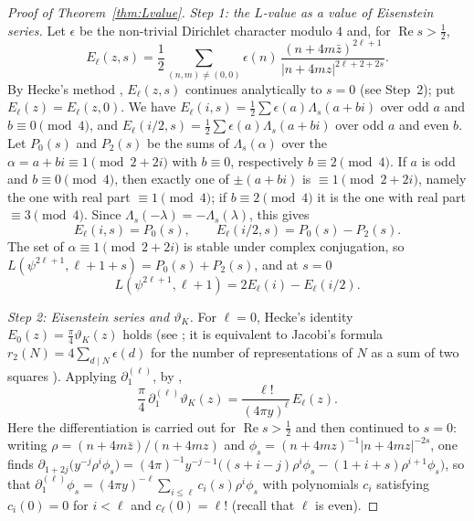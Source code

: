 \documentclass[11pt]{amsart}
\theoremstyle{definition}
\theoremstyle{remark}
\begin{document}
\begin{proof}[Proof of Theorem~\ref{thm:Lvalue}]
\emph{Step 1: the $L$-value as a value of Eisenstein series.} Let $\epsilon$ be the non-trivial
Dirichlet character modulo $4$ and, for $\operatorname{Re}s>\frac12$,
\[
E_\ell(z,s)=\frac12\sum_{(n,m)\ne(0,0)}\epsilon(n)\,\frac{(n+4m\bar z)^{2\ell+1}}{|n+4mz|^{2\ell+2+2s}} .
\]
By Hecke's method \cite{Hecke27}, $E_\ell(z,s)$ continues analytically to $s=0$ (see Step~2); put $E_\ell(z)=E_\ell(z,0)$. We have
$E_\ell(i,s)=\frac12\sum\epsilon(a)\Lambda_s(a+bi)$ over odd $a$ and $b\equiv0\pmod4$, and
$E_\ell(i/2,s)=\frac12\sum\epsilon(a)\Lambda_s(a+bi)$ over odd $a$ and even $b$. Let $P_0(s)$ and
$P_2(s)$ be the sums of $\Lambda_s(\alpha)$ over the $\alpha=a+bi\equiv1\pmod{2+2i}$ with
$b\equiv0$, respectively $b\equiv2\pmod4$. If $a$ is odd and $b\equiv0\pmod4$, then exactly one of
$\pm(a+bi)$ is $\equiv1\pmod{2+2i}$, namely the one with real part $\equiv1\pmod4$; if
$b\equiv2\pmod4$ it is the one with real part $\equiv3\pmod4$. Since
$\Lambda_s(-\lambda)=-\Lambda_s(\lambda)$, this gives
\[
E_\ell(i,s)=P_0(s),\qquad E_\ell(i/2,s)=P_0(s)-P_2(s).
\]
The set of $\alpha\equiv1\pmod{2+2i}$ is stable under complex conjugation, so
$L(\psi^{2\ell+1},\ell+1+s)=P_0(s)+P_2(s)$, and at $s=0$
\begin{equation}\label{eq:L-eis}
L(\psi^{2\ell+1},\ell+1)=2E_\ell(i)-E_\ell(i/2).
\end{equation}

\emph{Step 2: Eisenstein series and $\vartheta_K$.} For $\ell=0$, Hecke's identity
$E_0(z)=\frac\pi4\vartheta_K(z)$ holds (see \cite[proof of Proposition~2.7]{Nomoto}; it is
equivalent to Jacobi's formula $r_2(N)=4\sum_{d\mid N}\epsilon(d)$ for the number of
representations of $N$ as a sum of two squares \cite[Theorem~278]{HW}). Applying $\partial_1^{(\ell)}$, by
\cite[(16)]{VZ},
\begin{equation}\label{eq:eis-theta}
\frac\pi4\,\partial_1^{(\ell)}\vartheta_K(z)=\frac{\ell!}{(4\pi y)^\ell}\,E_\ell(z).
\end{equation}
Here the differentiation is carried out for $\operatorname{Re}s>\frac12$ and then continued to
$s=0$: writing $\rho=(n+4m\bar z)/(n+4mz)$ and $\phi_s=(n+4mz)^{-1}|n+4mz|^{-2s}$, one finds
$\partial_{1+2j}\bigl(y^{-j}\rho^i\phi_s\bigr)=(4\pi)^{-1}y^{-j-1}\bigl((s+i-j)\rho^i\phi_s
-(1+i+s)\rho^{i+1}\phi_s\bigr)$, so that
$\partial_1^{(\ell)}\phi_s=(4\pi y)^{-\ell}\sum_{i\le \ell}c_i(s)\rho^i\phi_s$ with polynomials $c_i$
satisfying $c_i(0)=0$ for $i<\ell$ and $c_\ell(0)=\ell!$ (recall that $\ell$ is even).


\end{proof}
\end{document}
